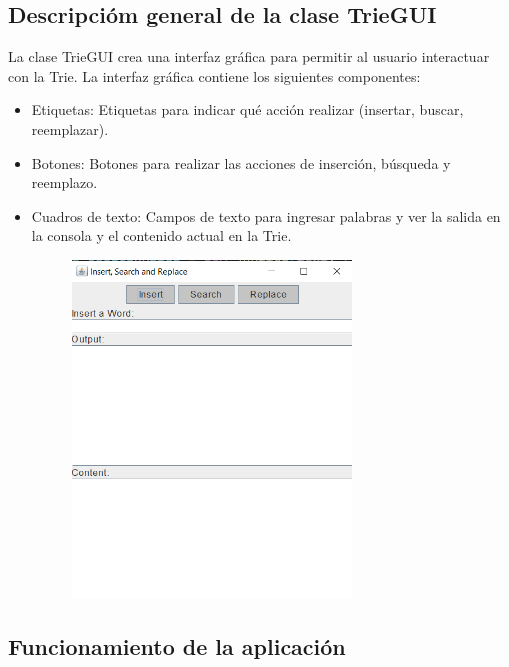\documentclass{article}
\begin{document}
	
	\subsection{Descripcióm general de la clase TrieGUI}
	La clase TrieGUI crea una interfaz gráfica para permitir al usuario interactuar con la Trie. 		    La interfaz gráfica contiene los siguientes componentes:
	\begin{itemize}
		\item Etiquetas: Etiquetas para indicar qué acción realizar (insertar, buscar, reemplazar).
		\item Botones: Botones para realizar las acciones de inserción, búsqueda y reemplazo.
		\item Cuadros de texto: Campos de texto para ingresar palabras y ver la salida en la consola y el contenido actual en la Trie.
		
		\begin{figure}[H]
		\centering
		\includegraphics[width=0.7\textwidth, height=0.7\textwidth,keepaspectratio]{pruebas/visual1.png}
	\end{figure}
	
	\end{itemize}
	\clearpage
	\subsection{Funcionamiento de la aplicación}
	
\end{document}
